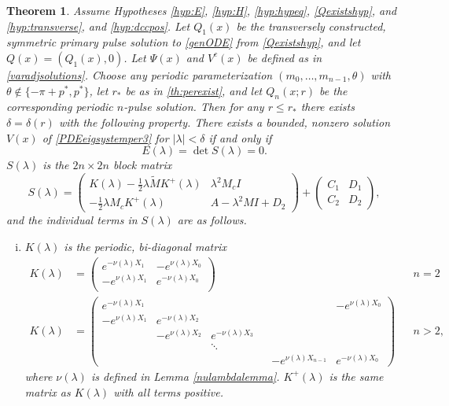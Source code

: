 \documentclass[10pt,reqno]{amsart}
\theoremstyle{plain}
\newtheorem{theorem}{Theorem}
\theoremstyle{definition}
\theoremstyle{remark}
\numberwithin{theorem}{section}
\numberwithin{equation}{section}
\begin{document}
\begin{theorem}\label{blockmatrixtheorem}
Assume Hypotheses \ref{hyp:E}, \ref{hyp:H}, \ref{hyp:hypeq}, \ref{Qexistshyp}, and \ref{hyp:transverse}, and \ref{hyp:dccpos}. Let $Q_1(x)$ be the transversely constructed, symmetric primary pulse solution to \eqref{genODE} from \cref{Qexistshyp}, and let $Q(x) = (Q_1(x), 0)$. Let $\Psi(x)$ and $V^c(x)$ be defined as in \cref{varadjsolutions}. Choose any periodic parameterization $(m_0, \dots, m_{n-1}, \theta)$ with $\theta \notin \{-\pi + p^*, p^* \}$, let $r_*$ be as in \cref{th:perexist}, and let $Q_n(x; r)$ be the corresponding periodic $n$-pulse solution. Then for any $r \leq r_*$ there exists $\delta = \delta(r)$ with the following property. There exists a bounded, nonzero solution $V(x)$ of \cref{PDEeigsystemper3} for $|\lambda| < \delta$ if and only if
\begin{equation}\label{blockmatrixcond}
E(\lambda) = \det S(\lambda) = 0.
\end{equation}
$S(\lambda)$ is the $2n \times 2n$ block matrix
\begin{equation}\label{blockeq}
S(\lambda) = 
\begin{pmatrix}
K(\lambda) - \frac{1}{2} \lambda \tilde{M} K^+(\lambda) & \lambda^2 M_c I \\
-\frac{1}{2} \lambda M_c K^+(\lambda) & A - \lambda^2 MI + D_2
\end{pmatrix} +
\begin{pmatrix}C_1 & D_1 \\ C_2 & D_2
\end{pmatrix},
\end{equation}
and the individual terms in $S(\lambda)$ are as follows.

\begin{enumerate}[(i)]
\item $K(\lambda)$ is the periodic, bi-diagonal matrix
\begin{align*}
K(\lambda) &=  
\begin{pmatrix}
e^{-\nu(\lambda)X_1} & -e^{\nu(\lambda)X_0} \\
-e^{\nu(\lambda)X_1} & e^{-\nu(\lambda)X_0} \\
\end{pmatrix} && n = 2\\
K(\lambda) &=  
\begin{pmatrix}
e^{-\nu(\lambda)X_1} & & & & & -e^{\nu(\lambda)X_0} \\
-e^{\nu(\lambda)X_1} & e^{-\nu(\lambda)X_2} \\
& -e^{\nu(\lambda)X_2} & e^{-\nu(\lambda)X_3} \\
  & & \ddots & && \\
& & & & -e^{\nu(\lambda)X_{n-1}} & e^{-\nu(\lambda)X_0}
\end{pmatrix} && n > 2,
\end{align*}
where $\nu(\lambda)$ is defined in Lemma \ref{nulambdalemma}. $K^+(\lambda)$ is the same matrix as $K(\lambda)$ with all terms positive.


\end{enumerate}
\end{theorem}
\end{document}
